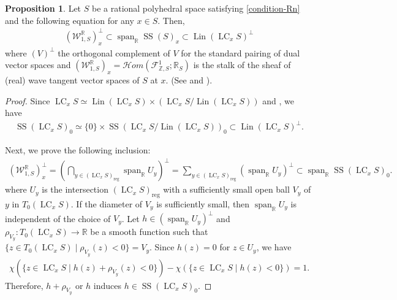 \documentclass[a4paper,dvipdfmx,reqno,12pt]{amsart}
\theoremstyle{definition}
\newtheorem{proposition}[theorem]{Proposition}
\newcommand{\opn}[1]{\operatorname{#1}}
\numberwithin{equation}{section}
\begin{document}
\begin{proposition}
\label{condition-good-linearity-space}
Let $S$ be a rational polyhedral space 
satisfying \cref{condition-Rn} and the following
equation for any $x\in S$. Then,
\begin{align} \label{equation-W-SS-Lin}
(\mathcal{W}_{1,S}^{\mathbb{R}})_{x}^{\bot}\subset 
\opn{span}_{{\mathbb{R}}}\opn{SS}(S)_x\subset
\opn{Lin}(\opn{LC}_xS)^{\bot}
\end{align}
where $(V)^{\bot}$ the orthogonal complement of 
$V$ for the standard pairing of dual vector spaces
and $(\mathcal{W}_{1,S}^{\mathbb{R}})_{x}=
\mathcal{H}om(\mathcal{F}^{1}_{\mathbb{Z},S};\mathbb{R}_S)$ is 
the stalk of the sheaf of (real) wave tangent 
vector spaces of $S$ at $x$. (See \cite[1.3]{mikhalkinTropicalEigenwaveIntermediate2014a} and 
\cite[Definition 2.16, Remark 2.21]{yamamotoTropicalContractionsIntegral2021}).
\end{proposition}
\begin{proof}
Since
$\opn{LC}_x S\simeq 
\opn{Lin}(\opn{LC}_x S)\times 
(\opn{LC}_x S/\opn{Lin}(\opn{LC}_x S))$
and 
\cite[Proposition 5.4.1]{MR1299726}, we have
\begin{align} 
\opn{SS}(\opn{LC}_x S)_0\simeq \{0\}\times 
\opn{SS}(\opn{LC}_x S/\opn{Lin}(\opn{LC}_x S))_0
\subset \opn{Lin}(\opn{LC}_xS)^{\bot}.
\end{align}

Next, we prove the following inclusion:
\begin{align}
(\mathcal{W}_{1,S}^{\mathbb{R}})_{x}^{\bot}=(\bigcap_{y \in (\opn{LC}_xS)_{\opn{reg}}} 
\opn{span}_{\mathbb{R}} U_y)^{\bot}=
\sum_{y \in (\opn{LC}_xS)_{\opn{reg}}} 
(\opn{span}_{\mathbb{R}} U_y)^{\bot} \subset 
\opn{span}_{\mathbb{R}}\opn{SS}(\opn{LC}_x S)_0.
\end{align}
where $U_y$ is the intersection 
$(\opn{LC}_xS)_{\opn{reg}}$ with a sufficiently 
small open ball $V_y$ of $y$ in $T_0(\opn{LC}_xS)$.
If the diameter of $V_y$ is sufficiently small, 
then $\opn{span}_{\mathbb{R}} U_y$ is independent of 
the choice of $V_y$. 
Let $h\in (\opn{span}_{\mathbb{R}} U_y)^{\bot}$ and 
$\rho_{V_y}\colon T_0 (\opn{LC}_x S)\to \mathbb{R}$
be a smooth function such that 
$\{z \in T_0 (\opn{LC}_x S) \mid \rho_{V_y}(z)<0\}=V_y$.
Since $h(z)=0$ for $z\in U_y$, we have
\begin{align}
\chi(\{z\in \opn{LC}_x S\mid h(z)+\rho_{V_y}(z)<0\})
-\chi(\{z\in \opn{LC}_x S\mid h(z)<0\})=1.
\end{align}
Therefore, $h+\rho_{V_y}$ or $h$ induces 
$h\in \opn{SS}(\opn{LC}_x S)_0$.
\end{proof}
\end{document}
